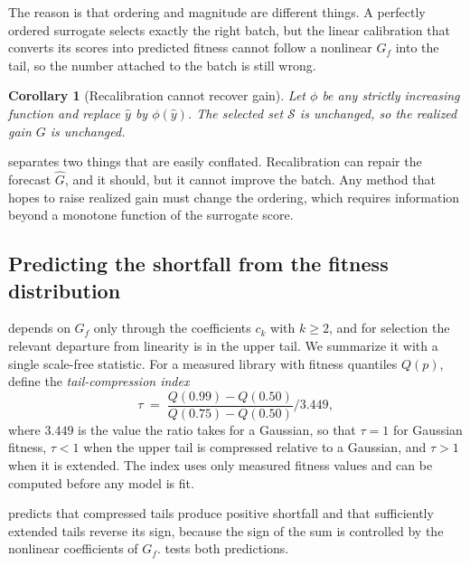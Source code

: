 \documentclass{article}
\theoremstyle{plain}
\newtheorem{corollary}[theorem]{Corollary}
\theoremstyle{definition}
\newcommand{\yhat}{\hat{y}}
\begin{document}
The reason is that ordering and magnitude are different things. A perfectly ordered
surrogate selects exactly the right batch, but the linear calibration that converts its
scores into predicted fitness cannot follow a nonlinear $G_{\!f}$ into the tail, so the
number attached to the batch is still wrong.

\begin{corollary}[Recalibration cannot recover gain]
\label{cor:monotone}
Let $\phi$ be any strictly increasing function and replace $\yhat$ by $\phi(\yhat)$.
The selected set $\mathcal{S}$ is unchanged, so the realized gain $G$ is unchanged.
\end{corollary}

 separates two things that are easily conflated. Recalibration can
repair the forecast $\hat{G}$, and it should, but it cannot improve the batch. Any
method that hopes to raise realized gain must change the ordering, which requires
information beyond a monotone function of the surrogate score.

\subsection{Predicting the shortfall from the fitness distribution}
\label{sec:tau}

 depends on $G_{\!f}$ only through the coefficients $c_k$ with $k \ge 2$,
and for selection the relevant departure from linearity is in the upper tail. We
summarize it with a single scale-free statistic. For a measured library with fitness
quantiles $Q(p)$, define the \emph{tail-compression index}
\begin{equation}
\tau \;=\; \frac{Q(0.99)-Q(0.50)}{Q(0.75)-Q(0.50)} \Big/ 3.449,
\label{eq:tau}
\end{equation}
where $3.449$ is the value the ratio takes for a Gaussian, so that $\tau = 1$ for
Gaussian fitness, $\tau < 1$ when the upper tail is compressed relative to a Gaussian,
and $\tau > 1$ when it is extended. The index uses only measured fitness values and can
be computed before any model is fit.

 predicts that compressed tails produce positive shortfall and that
sufficiently extended tails reverse its sign, because the sign of the sum is controlled
by the nonlinear coefficients of $G_{\!f}$.  tests both predictions.
\end{document}
